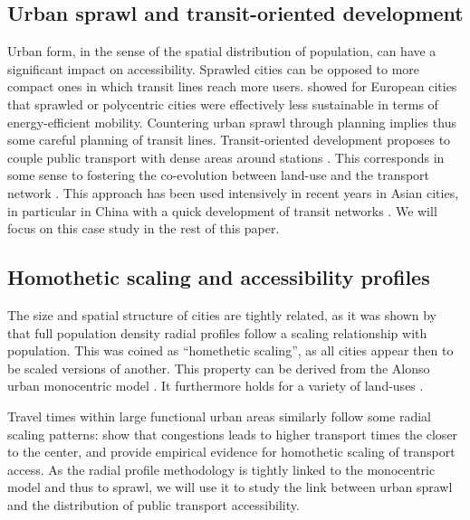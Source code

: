 \documentclass{article}
\begin{document}
\subsection{Urban sprawl and transit-oriented development}

Urban form, in the sense of the spatial distribution of population, can have a significant impact on accessibility. Sprawled cities can be opposed to more compact ones \cite{tsai2005quantifying} in which transit lines reach more users. \cite{le2012urban} showed for European cities that sprawled or polycentric cities were effectively less sustainable in terms of energy-efficient mobility. Countering urban sprawl through planning implies thus some careful planning of transit lines. Transit-oriented development proposes to couple public transport with dense areas around stations \cite{dittmar2012new}. This corresponds in some sense to fostering the co-evolution between land-use and the transport network \cite{raimbault2021characterising}. This approach has been used intensively in recent years in Asian cities, in particular in China with a quick development of transit networks \cite{raimbault2018evolving}. We will focus on this case study in the rest of this paper.


\subsection{Homothetic scaling and accessibility profiles}

The size and spatial structure of cities are tightly related, as it was shown by \cite{lemoy2020evidence} that full population density radial profiles follow a scaling relationship with population. This was coined as ``homethetic scaling'', as all cities appear then to be scaled versions of another. This property can be derived from the Alonso urban monocentric model \cite{delloye2020alonso}. It furthermore holds for a variety of land-uses \cite{lemoy2021radial}.

Travel times within large functional urban areas similarly follow some radial scaling patterns: \cite{mennicken2019internal} show that congestions leads to higher transport times the closer to the center, and provide empirical evidence for homothetic scaling of transport access. As the radial profile methodology is tightly linked to the monocentric model and thus to sprawl, we will use it to study the link between urban sprawl and the distribution of public transport accessibility.
\end{document}
